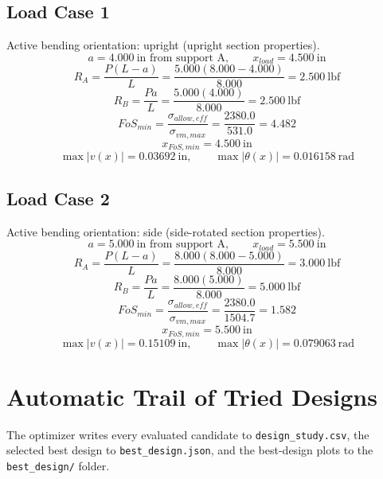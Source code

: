 \documentclass[11pt]{article}
\begin{document}
\subsection*{Load Case 1}
Active bending orientation: upright (upright section properties).
\[a = 4.000\ \mathrm{in} \text{ from support A}, \qquad x_{load} = 4.500\ \mathrm{in}\]
\[R_A = \frac{P(L-a)}{L} = \frac{5.000(8.000-4.000)}{8.000} = 2.500\ \mathrm{lbf}\]
\[R_B = \frac{Pa}{L} = \frac{5.000(4.000)}{8.000} = 2.500\ \mathrm{lbf}\]
\[FoS_{min} = \frac{\sigma_{allow,eff}}{\sigma_{vm,max}} = \frac{2380.0}{531.0} = 4.482\]
\[x_{FoS,min} = 4.500\ \mathrm{in}\]
\[\max |v(x)| = 0.03692\ \mathrm{in}, \qquad \max |\theta(x)| = 0.016158\ \mathrm{rad}\]
\subsection*{Load Case 2}
Active bending orientation: side (side-rotated section properties).
\[a = 5.000\ \mathrm{in} \text{ from support A}, \qquad x_{load} = 5.500\ \mathrm{in}\]
\[R_A = \frac{P(L-a)}{L} = \frac{8.000(8.000-5.000)}{8.000} = 3.000\ \mathrm{lbf}\]
\[R_B = \frac{Pa}{L} = \frac{8.000(5.000)}{8.000} = 5.000\ \mathrm{lbf}\]
\[FoS_{min} = \frac{\sigma_{allow,eff}}{\sigma_{vm,max}} = \frac{2380.0}{1504.7} = 1.582\]
\[x_{FoS,min} = 5.500\ \mathrm{in}\]
\[\max |v(x)| = 0.15109\ \mathrm{in}, \qquad \max |\theta(x)| = 0.079063\ \mathrm{rad}\]

\section*{Automatic Trail of Tried Designs}
The optimizer writes every evaluated candidate to \texttt{design\_study.csv}, the selected best design to \texttt{best\_design.json}, and the best-design plots to the \texttt{best\_design/} folder.
\end{document}
